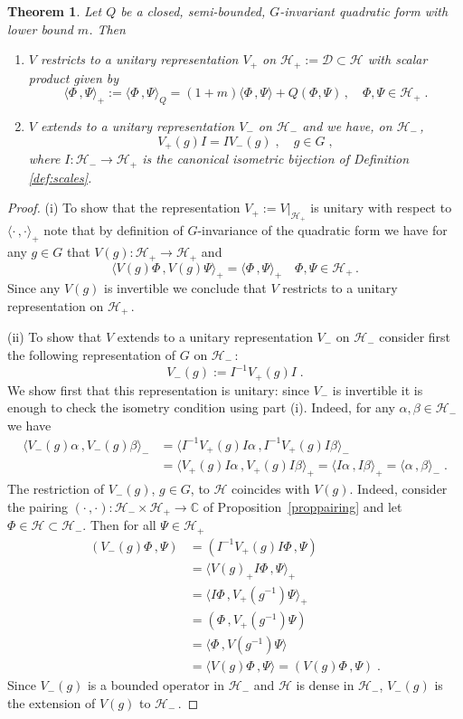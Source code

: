\documentclass[a4paper,12pt]{amsart}
\newcommand{\scalar}[2]{\langle#1\,,#2\rangle}
\newcommand{\pair}[2]{(#1\,,#2)}
\renewcommand{\H}{\mathcal{H}}
\newcommand{\1}{\mathbb{I}}
\newtheorem{theorem}{Theorem}
\numberwithin{equation}{section}
\numberwithin{theorem}{section}
\begin{document}
\begin{theorem}\label{thm:unit-scales}
Let $Q$ be a closed, semi-bounded, $G$-invariant quadratic form with lower bound $m$. Then
\begin{enumerate}
\item $V$ restricts to a unitary representation $V_+$ on $\mathcal{H}_+:=\mathcal{D}\subset\mathcal{H}$ with scalar product given by
$$\scalar{\Phi}{\Psi}_+:=\scalar{\Phi}{\Psi}_Q=(1+m)\scalar{\Phi}{\Psi}+Q(\Phi,\Psi)\,,\quad \Phi,\Psi\in\H_+\;.$$

\item $V$ extends to a unitary representation $V_-$ on $\mathcal{H}_-$ and we have, on $\mathcal{H}_-$\,,
\begin{equation}\label{eq:commute-I}
V_+(g) I=I V_-(g)\;,\quad g\in G\;,
\end{equation}
where $I\colon \mathcal{H}_-\to \mathcal{H}_+$ is the canonical isometric bijection of Definition \ref{def:scales}.
	\end{enumerate}
\end{theorem}
\begin{proof}
(i) To show that the representation $V_+:=V|_{\H_+}$ is unitary with respect to $\scalar{\cdot}{\cdot}_+$
    note that by definition of $G$-invariance of the quadratic form we have
    for any $g\in G$ that $V(g)\colon\mathcal{H}_+\to \mathcal{H}_+$ and
$$
 \scalar{V(g)\Phi}{V(g)\Psi}_+=\scalar{\Phi}{\Psi}_+\quad \Phi,\Psi\in\H_+\,.
$$
Since any $V(g)$ is invertible we conclude that $V$ restricts to a unitary representation on $\mathcal{H}_+$\,.


(ii) To show that $V$ extends to a unitary representation $V_-$ on $\H_-$ consider first the following representation of $G$ on $\H_-$\,:
$$
V_-(g):=I^{-1}V_+(g)I\;.
$$
We show first that this representation is unitary: since $V_-$ is invertible it is enough to check the
isometry condition using part (i). Indeed, for any $\alpha,\beta\in\H_-$ we have
\begin{align*}
\scalar{V_-(g)\alpha}{V_-(g)\beta}_-&=\scalar{I^{-1}V_+(g)I\alpha}{I^{-1}V_+(g)I\beta}_-\\
&=\scalar{V_+(g)I\alpha}{V_+(g)I\beta}_+=\scalar{I\alpha}{I\beta}_+=\scalar{\alpha}{\beta}_-\;.
\end{align*}
The restriction of $V_-(g)$, $g\in G$, to $\H$ coincides with $V(g)$. Indeed, consider the pairing $\pair{\cdot}{\cdot}\colon\H_-\times\H_+\to\mathbb{C}$ of Proposition~\ref{proppairing} and 
let $\Phi\in\H\subset\H_-$. Then for all $\Psi\in\H_+$
\begin{align*}
\pair{V_-(g)\Phi}{\Psi}&=\pair{I^{-1}V_+(g)I\Phi}{\Psi}\\
&=\scalar{V(g)_+I\Phi}{\Psi}_+\\
&=\scalar{I\Phi}{V_+(g^{-1})\Psi}_+\\
&=\pair{\Phi}{V_+(g^{-1})\Psi}\\
&=\scalar{\Phi}{V(g^{-1})\Psi}\\
&=\scalar{V(g)\Phi}{\Psi}=\pair{V(g)\Phi}{\Psi}\;.
\end{align*}
Since $V_-(g)$ is a bounded operator in $\H_-$ and $\H$ is dense in $\H_-$, $V_-(g)$ is the extension of $V(g)$ to $\H_-$\,.
\end{proof}
\end{document}
